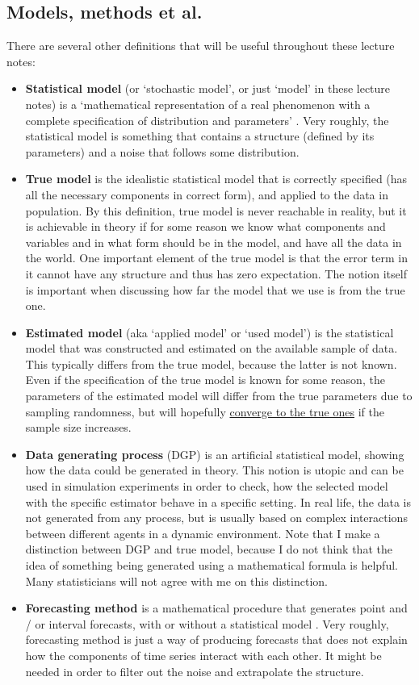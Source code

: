 \documentclass[
]{book}
\providecommand{\tightlist}{%
  \setlength{\itemsep}{0pt}\setlength{\parskip}{0pt}}
\theoremstyle{definition}
\theoremstyle{definition}
\theoremstyle{definition}
\theoremstyle{definition}
\theoremstyle{remark}
\begin{document}
\subsection{Models, methods et al.~}\label{modelsMethods}

There are several other definitions that will be useful throughout these lecture notes:

\begin{itemize}
\tightlist
\item
  \textbf{Statistical model} (or `stochastic model', or just `model' in these lecture notes) is a `mathematical representation of a real phenomenon with a complete specification of distribution and parameters' \citep{Svetunkov2019a}. Very roughly, the statistical model is something that contains a structure (defined by its parameters) and a noise that follows some distribution.
\item
  \textbf{True model} is the idealistic statistical model that is correctly specified (has all the necessary components in correct form), and applied to the data in population. By this definition, true model is never reachable in reality, but it is achievable in theory if for some reason we know what components and variables and in what form should be in the model, and have all the data in the world. One important element of the true model is that the error term in it cannot have any structure and thus has zero expectation. The notion itself is important when discussing how far the model that we use is from the true one.
\item
  \textbf{Estimated model} (aka `applied model' or `used model') is the statistical model that was constructed and estimated on the available sample of data. This typically differs from the true model, because the latter is not known. Even if the specification of the true model is known for some reason, the parameters of the estimated model will differ from the true parameters due to sampling randomness, but will hopefully \hyperref[statistics]{converge to the true ones} if the sample size increases.
\item
  \textbf{Data generating process} (DGP) is an artificial statistical model, showing how the data could be generated in theory. This notion is utopic and can be used in simulation experiments in order to check, how the selected model with the specific estimator behave in a specific setting. In real life, the data is not generated from any process, but is usually based on complex interactions between different agents in a dynamic environment. Note that I make a distinction between DGP and true model, because I do not think that the idea of something being generated using a mathematical formula is helpful. Many statisticians will not agree with me on this distinction.
\item
  \textbf{Forecasting method} is a mathematical procedure that generates point and / or interval forecasts, with or without a statistical model \citep{Svetunkov2019a}. Very roughly, forecasting method is just a way of producing forecasts that does not explain how the components of time series interact with each other. It might be needed in order to filter out the noise and extrapolate the structure.
\end{itemize}
\end{document}
